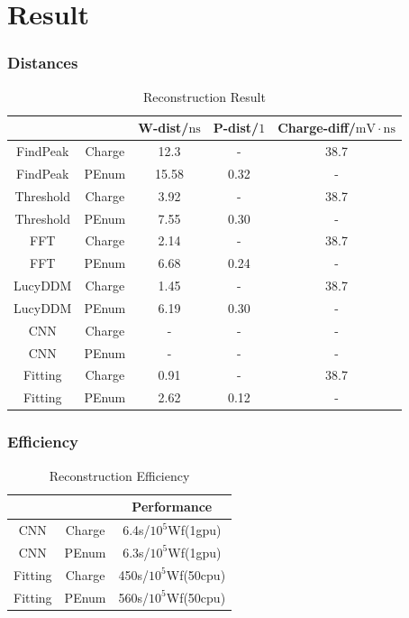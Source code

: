 \documentclass{beamer}
\begin{document}
\section{Result}
\begin{frame}
\frametitle{Distances}
\setlength{\belowcaptionskip}{-2mm}
\begin{table}
    \centering
    \caption{Reconstruction Result}
    \begin{tabular}{c|c|c|c|c}
        \hline
        &  & W-dist/$\mathrm{ns}$ & P-dist/$\mathrm{1}$ & Charge-diff/$\mathrm{mV}\cdot\mathrm{ns}$ \\
        \hline
        FindPeak & Charge & 12.3 & - & 38.7 \\
        \hline
        FindPeak & PEnum & 15.58 & 0.32 & - \\
        \hline
        Threshold & Charge & 3.92 & - & 38.7 \\
        \hline
        Threshold & PEnum & 7.55 & 0.30 & - \\
        \hline
        FFT & Charge & 2.14 & - & 38.7 \\
        \hline
        FFT & PEnum & 6.68 & 0.24 & - \\
        \hline
        LucyDDM & Charge & 1.45 & - & 38.7 \\
        \hline
        LucyDDM & PEnum & 6.19 & 0.30 & - \\
        \hline
        CNN & Charge & - & - & - \\
        \hline
        CNN & PEnum & - & - & - \\
        \hline
        Fitting & Charge & 0.91 & - & 38.7 \\
        \hline
        Fitting & PEnum & 2.62 & 0.12 & - \\
        \hline
    \end{tabular}
\end{table}
\end{frame}

\begin{frame}
\frametitle{Efficiency}
\begin{table}
    \centering
    \caption{Reconstruction Efficiency}
    \begin{tabular}{c|c|c}
        \hline
        &  & Performance \\
        \hline
        CNN & Charge & 6.4s/$10^{5}$Wf(1gpu) \\
        \hline
        CNN & PEnum & 6.3s/$10^{5}$Wf(1gpu)\\
        \hline
        Fitting & Charge & 450s/$10^{5}$Wf(50cpu) \\
        \hline
        Fitting & PEnum & 560s/$10^{5}$Wf(50cpu) \\
        \hline
    \end{tabular}
\end{table}
\end{frame}
\end{document}
